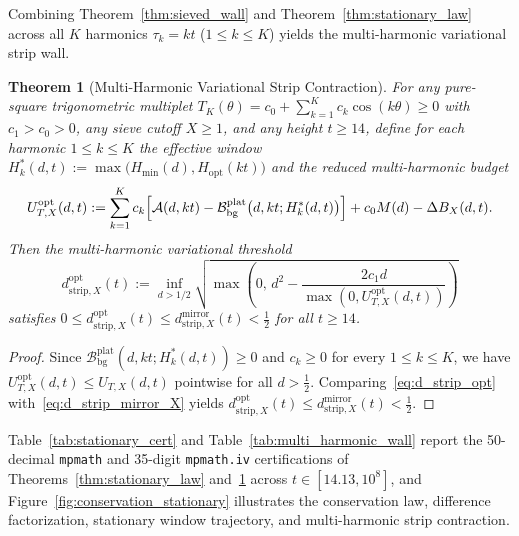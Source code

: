 \documentclass[11pt,reqno]{amsart}
\newtheorem{theorem}{Theorem}[section]
\theoremstyle{definition}
\theoremstyle{remark}
\numberwithin{equation}{section}
\begin{document}
Combining Theorem~\ref{thm:sieved_wall} and Theorem~\ref{thm:stationary_law} across all $K$ harmonics $\tau_k = kt$ ($1 \le k \le K$) yields the multi-harmonic variational strip wall.

\begin{theorem}[Multi-Harmonic Variational Strip Contraction]\label{thm:multi_harmonic_wall}
For any pure-square trigonometric multiplet $T_K(\theta) = c_0 + \sum_{k=1}^K c_k\cos(k\theta) \ge 0$ with $c_1 > c_0 > 0$, any sieve cutoff $X \ge 1$, and any height $t \ge 14$, define for each harmonic $1 \le k \le K$ the effective window $H_k^*(d,t) := \max\bigl(H_{\min}(d), H_{\mathrm{opt}}(kt)\bigr)$ and the reduced multi-harmonic budget
\begin{equation}\label{eq:U_T_X_opt}
U_{T,X}^{\mathrm{opt}}(d,t) := \sum_{k=1}^K c_k\Bigl[\mathcal{A}(d,kt) - \mathcal{B}_{\mathrm{bg}}^{\mathrm{plat}}\bigl(d, kt; H_k^*(d,t)\bigr)\Bigr] + c_0 M(d) - \Delta B_X(d,t).
\end{equation}
Then the multi-harmonic variational threshold
\begin{equation}\label{eq:d_strip_opt}
d_{\mathrm{strip},X}^{\mathrm{opt}}(t) := \inf_{d > 1/2}\sqrt{\max\!\left(0,\, d^2 - \frac{2c_1 d}{\max(0, U_{T,X}^{\mathrm{opt}}(d,t))}\right)}
\end{equation}
satisfies $0 \le d_{\mathrm{strip},X}^{\mathrm{opt}}(t) \le d_{\mathrm{strip},X}^{\mathrm{mirror}}(t) < \frac{1}{2}$ for all $t \ge 14$.
\end{theorem}

\begin{proof}
Since $\mathcal{B}_{\mathrm{bg}}^{\mathrm{plat}}(d, kt; H_k^*(d,t)) \ge 0$ and $c_k \ge 0$ for every $1 \le k \le K$, we have $U_{T,X}^{\mathrm{opt}}(d,t) \le U_{T,X}(d,t)$ pointwise for all $d > \frac{1}{2}$. Comparing~\eqref{eq:d_strip_opt} with~\eqref{eq:d_strip_mirror_X} yields $d_{\mathrm{strip},X}^{\mathrm{opt}}(t) \le d_{\mathrm{strip},X}^{\mathrm{mirror}}(t) < \frac{1}{2}$.
\end{proof}

Table~\ref{tab:stationary_cert} and Table~\ref{tab:multi_harmonic_wall} report the 50-decimal \texttt{mpmath} and 35-digit \texttt{mpmath.iv} certifications of Theorems~\ref{thm:stationary_law} and~\ref{thm:multi_harmonic_wall} across $t \in [14.13, 10^8]$, and Figure~\ref{fig:conservation_stationary} illustrates the conservation law, difference factorization, stationary window trajectory, and multi-harmonic strip contraction.
\end{document}
